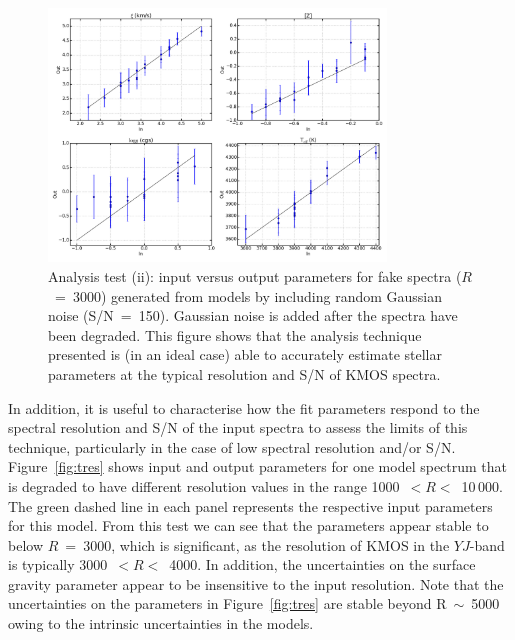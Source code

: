 
\begin{figure}
 \centering
 \includegraphics[width=0.80\textwidth]{JAnal/Fakespec-t2-v2}
 \caption[Analysis test (ii): input against output parameters using fake RSG spectra at S/N~=~150 ($R$~=~3000)]{
 Analysis test (ii): input versus output parameters for fake spectra
 ($R$~=~3000) generated from models by including random Gaussian noise (S/N~=~150).
Gaussian noise is added after the spectra have been degraded.
This figure shows that the analysis technique presented is (in an ideal case) able to accurately estimate stellar parameters at the typical resolution and S/N of KMOS spectra.
\label{fig:t2}
         }
\end{figure}

In addition, it is useful to characterise how the fit parameters respond to the spectral resolution and S/N of the input spectra to assess the limits of this technique, particularly in the case of low spectral resolution and/or S/N.
Figure~\ref{fig:tres} shows input and output parameters for one model spectrum that is degraded to have different resolution values in the range 1000~$< R <$~10\,000.
The green dashed line in each panel represents the respective input parameters for this model.
From this test we can see that the parameters appear stable to below $R$~=~3000, which is significant, as the resolution of KMOS in the $YJ$-band is typically 3000~$< R <$~4000.
In addition, the uncertainties on the surface gravity parameter appear to be insensitive to the input resolution.
Note that the uncertainties on the parameters in Figure~\ref{fig:tres} are stable beyond R~$\sim$~5000 owing to the intrinsic uncertainties in the models.

